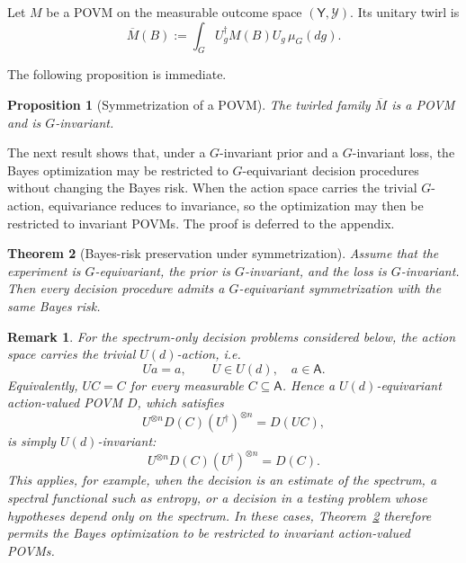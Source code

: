 \documentclass{article}
\newtheorem{theorem}{Theorem}[section]
\newtheorem{prop}[theorem]{Proposition}
\newtheorem{definition}{Definition}
\newtheorem{remark}{Remark}
\theoremstyle{named}
\theoremstyle{named1}
\theoremstyle{plain}
\theoremstyle{remark}
\begin{document}
Let $M$ be a POVM on the measurable outcome space
$(\mathsf Y,\mathcal Y)$.  Its unitary twirl is
\[
    \overline M(B)
    :=\int_G U_g^{\dagger} M(B)U_g\,\mu_G(dg).
\]


The following proposition is immediate.
\begin{prop}[Symmetrization of a POVM]\label{prop:symmetrization}
The twirled family $\overline M$ is a POVM and is $G$-invariant.
\end{prop}

The next result shows that, under a $G$-invariant prior and a
$G$-invariant loss, the Bayes optimization may be restricted to
$G$-equivariant decision procedures without changing the Bayes risk.
When the action space carries the trivial $G$-action, equivariance reduces
to invariance, so the optimization may then be restricted to invariant
POVMs. The proof is deferred to the appendix.

\begin{theorem}[Bayes-risk preservation under symmetrization]
\label{thm:symmetrization}
Assume that the experiment is $G$-equivariant, the prior is $G$-invariant,
and the loss is $G$-invariant. Then every decision procedure admits a
$G$-equivariant symmetrization with the same Bayes risk.
\end{theorem}

\begin{remark}
For the spectrum-only decision problems considered below, the action space
carries the trivial $U(d)$-action, i.e.
\[
    Ua=a,
    \qquad
    U\in U(d),\quad a\in\mathsf A.
\]
Equivalently, $UC=C$ for every measurable $C\subseteq\mathsf A$.
Hence a $U(d)$-equivariant action-valued POVM $D$, which satisfies
\[
    U^{\otimes n}D(C)(U^\dagger)^{\otimes n}
    =
    D(UC),
\]
is simply $U(d)$-invariant:
\[
    U^{\otimes n}D(C)(U^\dagger)^{\otimes n}
    =
    D(C).
\]
This applies, for example, when the decision is an estimate of the spectrum,
a spectral functional such as entropy, or a decision in a testing problem
whose hypotheses depend only on the spectrum.  In these cases,
Theorem~\ref{thm:symmetrization} therefore permits the Bayes optimization
to be restricted to invariant action-valued POVMs.
\end{remark}
\end{document}
